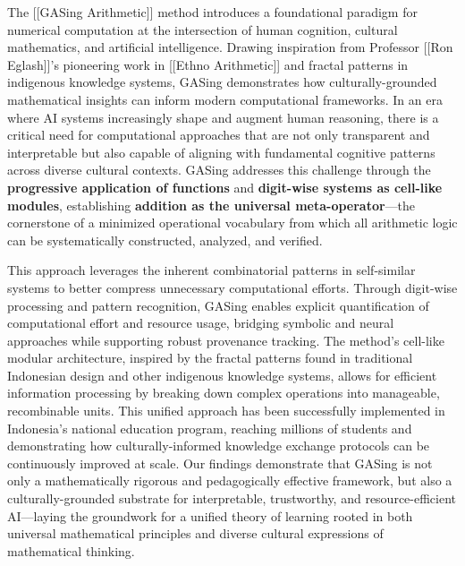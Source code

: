 The [[GASing Arithmetic]] method introduces a foundational paradigm for numerical computation at the intersection of human cognition, cultural mathematics, and artificial intelligence. Drawing inspiration from Professor [[Ron Eglash]]'s pioneering work in [[Ethno Arithmetic]] and fractal patterns in indigenous knowledge systems, GASing demonstrates how culturally-grounded mathematical insights can inform modern computational frameworks. In an era where AI systems increasingly shape and augment human reasoning, there is a critical need for computational approaches that are not only transparent and interpretable but also capable of aligning with fundamental cognitive patterns across diverse cultural contexts. GASing addresses this challenge through the \textbf{progressive application of functions} and \textbf{digit-wise systems as cell-like modules}, establishing \textbf{addition as the universal meta-operator}—the cornerstone of a minimized operational vocabulary from which all arithmetic logic can be systematically constructed, analyzed, and verified. 

This approach leverages the inherent combinatorial patterns in self-similar systems to better compress unnecessary computational efforts. Through digit-wise processing and pattern recognition, GASing enables explicit quantification of computational effort and resource usage, bridging symbolic and neural approaches while supporting robust provenance tracking. The method's cell-like modular architecture, inspired by the fractal patterns found in traditional Indonesian design and other indigenous knowledge systems, allows for efficient information processing by breaking down complex operations into manageable, recombinable units. This unified approach has been successfully implemented in Indonesia's national education program, reaching millions of students and demonstrating how culturally-informed knowledge exchange protocols can be continuously improved at scale. Our findings demonstrate that GASing is not only a mathematically rigorous and pedagogically effective framework, but also a culturally-grounded substrate for interpretable, trustworthy, and resource-efficient AI—laying the groundwork for a unified theory of learning rooted in both universal mathematical principles and diverse cultural expressions of mathematical thinking.
